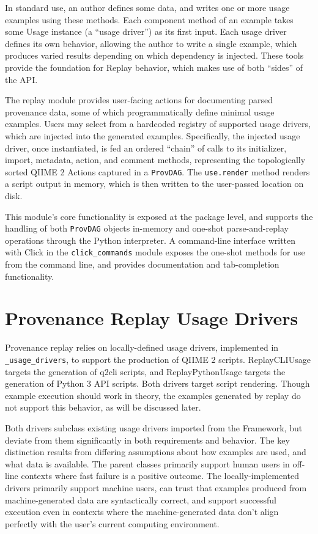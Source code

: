 In standard use, an author defines some data, and writes one or more usage
examples using these methods. Each component method of an example takes some
Usage instance (a “usage driver”) as its first input. Each usage driver defines
its own behavior, allowing the author to write a single example, which produces
varied results depending on which dependency is injected. These tools provide
the foundation for Replay behavior, which makes use of both “sides” of the API. 

The replay module provides user-facing actions for documenting parsed provenance
data, some of which programmatically define minimal usage examples. Users may
select from a hardcoded registry of supported usage drivers, which are injected
into the generated examples. Specifically, the injected usage driver, once
instantiated, is fed an ordered “chain” of calls to its initializer, import,
metadata, action, and comment methods, representing the topologically sorted
QIIME 2 Actions captured in a \texttt{ProvDAG}. The \texttt{use.render} method renders a script
output in memory, which is then written to the user-passed location on disk.

This module’s core functionality is exposed at the package level, and supports
the handling of both \texttt{ProvDAG} objects in-memory and one-shot parse-and-replay
operations through the Python interpreter. A command-line interface written with
Click \parencite{pallets_click_2014} in the \texttt{click\_commands} module exposes the
one-shot methods for use from the command line, and provides documentation and
tab-completion functionality.


\section{Provenance Replay Usage Drivers}

Provenance replay relies on locally-defined usage drivers, implemented in
\texttt{\_usage\_drivers}, to support the production of QIIME 2 scripts. ReplayCLIUsage
targets the generation of q2cli scripts, and ReplayPythonUsage targets the
generation of Python 3 API scripts. Both drivers target script rendering. Though
example execution should work in theory, the examples generated by replay do not
support this behavior, as will be discussed later.

Both drivers subclass existing usage drivers imported from the Framework, but
deviate from them significantly in both requirements and behavior. The key
distinction results from differing assumptions about how examples are used, and
what data is available. The parent classes primarily support human users in
off-line contexts where fast failure is a positive outcome. The
locally-implemented drivers primarily support machine users, can trust that
examples produced from machine-generated data are syntactically correct, and
support successful execution even in contexts where the machine-generated data
don’t align perfectly with the user’s current computing environment. 


